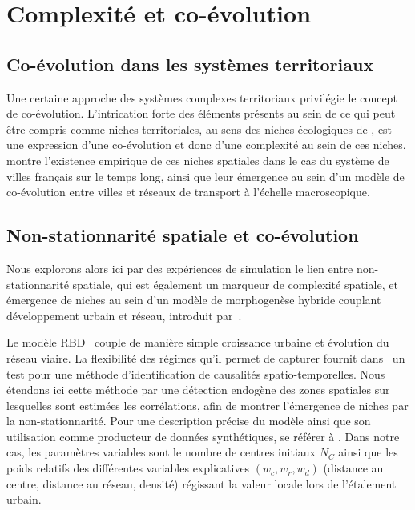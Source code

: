 \documentclass[11pt]{article}
\begin{document}



\section{Complexité et co-évolution}


\subsection{Co-évolution dans les systèmes territoriaux}

Une certaine approche des systèmes complexes territoriaux privilégie le concept de co-évolution. L'intrication forte des éléments présents au sein de ce qui peut être compris comme niches territoriales, au sens des niches écologiques de \cite{holland2012signals}, est une expression d'une co-évolution et donc d'une complexité au sein de ces niches. \cite{raimbault2018modeling} montre l'existence empirique de ces niches spatiales dans le cas du système de villes français sur le temps long, ainsi que leur émergence au sein d'un modèle de co-évolution entre villes et réseaux de transport à l'échelle macroscopique.


\subsection{Non-stationnarité spatiale et co-évolution}

Nous explorons alors ici par des expériences de simulation le lien entre non-stationnarité spatiale, qui est également un marqueur de complexité spatiale, et émergence de niches au sein d'un modèle de morphogenèse hybride couplant développement urbain et réseau, introduit par~\cite{raimbault2014hybrid}.

Le modèle RBD~\citep{raimbault2014hybrid} couple de manière simple croissance urbaine et évolution du réseau viaire. La flexibilité des régimes qu'il permet de capturer fournit dans~\cite{raimbault2017identification} un test pour une méthode d'identification de causalités spatio-temporelles. Nous étendons ici cette méthode par une détection endogène des zones spatiales sur lesquelles sont estimées les corrélations, afin de montrer l'émergence de niches par la non-stationnarité. Pour une description précise du modèle ainsi que son utilisation comme producteur de données synthétiques, se référer à \cite{raimbault2018caracterisation}. Dans notre cas, les paramètres variables sont le nombre de centres initiaux $N_C$ ainsi que les poids relatifs des différentes variables explicatives $(w_c,w_r,w_d)$ (distance au centre, distance au réseau, densité) régissant la valeur locale lors de l'étalement urbain.
\end{document}
